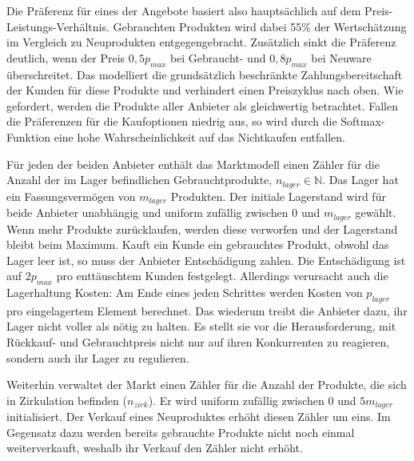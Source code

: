 Die Präferenz für eines der Angebote basiert also hauptsächlich auf dem Preis-Leistungs-Verhältnis.
Gebrauchten Produkten wird dabei 55\% der Wertschätzung im Vergleich zu Neuprodukten entgegengebracht.
Zusätzlich sinkt die Präferenz deutlich, wenn der Preis $0{,}5 p_{max}$ bei Gebraucht- und $0{,}8 p_{max}$ bei Neuware überschreitet.
Das modelliert die grundsätzlich beschränkte Zahlungsbereitschaft der Kunden für diese Produkte und verhindert einen Preiszyklus nach oben.
Wie gefordert, werden die Produkte aller Anbieter als gleichwertig betrachtet.
Fallen die Präferenzen für die Kaufoptionen niedrig aus, so wird durch die Softmax-Funktion eine hohe Wahrscheinlichkeit auf das Nichtkaufen entfallen.

Für jeden der beiden Anbieter enthält das Marktmodell einen Zähler für die Anzahl der im Lager befindlichen Gebrauchtprodukte, $n_{lager} \in \mathbb{N}$.
Das Lager hat ein Fassungsvermögen von $m_{lager}$ Produkten.
Der initiale Lagerstand wird für beide Anbieter unabhängig und uniform zufällig zwischen $0$ und $m_{lager}$ gewählt.
Wenn mehr Produkte zurücklaufen, werden diese verworfen und der Lagerstand bleibt beim Maximum.
Kauft ein Kunde ein gebrauchtes Produkt, obwohl das Lager leer ist, so muss der Anbieter Entschädigung zahlen.
Die Entschädigung ist auf $2 p_{max}$ pro enttäuschtem Kunden festgelegt.
Allerdings verursacht auch die Lagerhaltung Kosten: Am Ende eines jeden Schrittes werden Kosten von $p_{lager}$ pro eingelagertem Element berechnet.
Das wiederum treibt die Anbieter dazu, ihr Lager nicht voller als nötig zu halten.
Es stellt sie vor die Herausforderung, mit Rückkauf- und Gebrauchtpreis nicht nur auf ihren Konkurrenten zu reagieren, sondern auch ihr Lager zu regulieren.

Weiterhin verwaltet der Markt einen Zähler für die Anzahl der Produkte, die sich in Zirkulation befinden ($n_{zirk}$).
Er wird uniform zufällig zwischen $0$ und $5 m_{lager}$ initialisiert.
Der Verkauf eines Neuproduktes erhöht diesen Zähler um eins.
Im Gegensatz dazu werden bereits gebrauchte Produkte nicht noch einmal weiterverkauft, weshalb ihr Verkauf den Zähler nicht erhöht.

